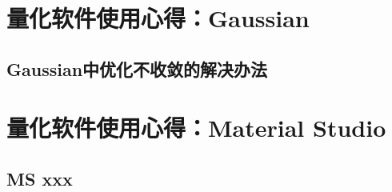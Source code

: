 \documentclass[10pt]{ctexrep}
\begin{document}

\section{量化软件使用心得：Gaussian}
\subsection{Gaussian中优化不收敛的解决办法}

\section{量化软件使用心得：Material Studio}
\subsection{MS xxx}
\end{document}
